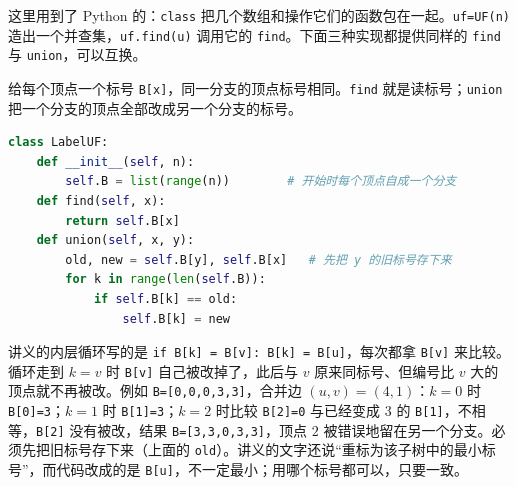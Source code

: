 这里用到了 Python 的：\texttt{class} 把几个数组和操作它们的函数包在一起。\texttt{uf=UF(n)} 造出一个并查集，\texttt{uf.find(u)} 调用它的 \texttt{find}。下面三种实现都提供同样的 \texttt{find} 与 \texttt{union}，可以互换。


给每个顶点一个标号 \texttt{B[x]}，同一分支的顶点标号相同。\texttt{find} 就是读标号；\texttt{union} 把一个分支的顶点全部改成另一个分支的标号。

\begin{lstlisting}[language=Python]
class LabelUF:
    def __init__(self, n):
        self.B = list(range(n))        # 开始时每个顶点自成一个分支
    def find(self, x):
        return self.B[x]
    def union(self, x, y):
        old, new = self.B[y], self.B[x]   # 先把 y 的旧标号存下来
        for k in range(len(self.B)):
            if self.B[k] == old:
                self.B[k] = new
\end{lstlisting}

\begin{remark}
讲义的内层循环写的是 \texttt{if B[k] = B[v]: B[k] = B[u]}，每次都拿 \texttt{B[v]} 来比较。循环走到 $k=v$ 时 \texttt{B[v]} 自己被改掉了，此后与 $v$ 原来同标号、但编号比 $v$ 大的顶点就不再被改。例如 \texttt{B=[0,0,0,3,3]}，合并边 $(u,v)=(4,1)$：$k=0$ 时 \texttt{B[0]=3}；$k=1$ 时 \texttt{B[1]=3}；$k=2$ 时比较 \texttt{B[2]=0} 与已经变成 $3$ 的 \texttt{B[1]}，不相等，\texttt{B[2]} 没有被改，结果 \texttt{B=[3,3,0,3,3]}，顶点 $2$ 被错误地留在另一个分支。必须先把旧标号存下来（上面的 \texttt{old}）。讲义的文字还说“重标为该子树中的最小标号”，而代码改成的是 \texttt{B[u]}，不一定最小；用哪个标号都可以，只要一致。
\end{remark}

